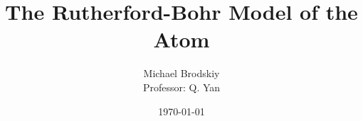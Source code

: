 


\title{The Rutherford-Bohr Model of the Atom}
\date{\today}
\author{Michael Brodskiy\\ \small Professor: Q. Yan}



\maketitle

\newpage

\tableofcontents

\newpage

